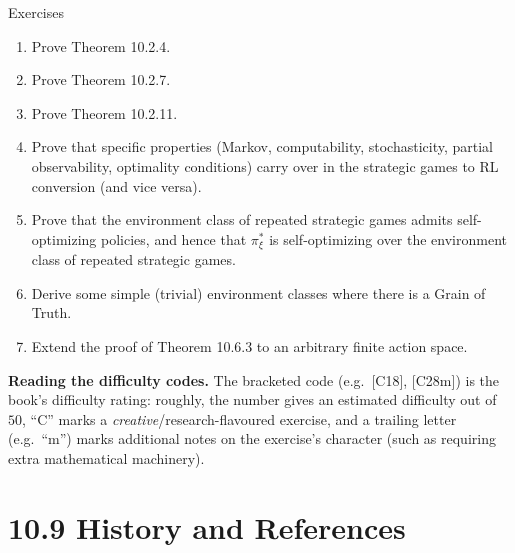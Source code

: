 \documentclass[aspectratio=169,10pt]{beamer}
\begin{document}
\begin{frame}[allowframebreaks]{Exercises}
  \begin{enumerate}
    \item[\textbf{1.}] [C18] Prove Theorem 10.2.4.
    \item[\textbf{2.}] [C28m] Prove Theorem 10.2.7.
    \item[\textbf{3.}] [C20] Prove Theorem 10.2.11.
    \item[\textbf{4.}] [C25] Prove that specific properties (Markov,
      computability, stochasticity, partial observability, optimality
      conditions) carry over in the strategic games to RL conversion (and
      vice versa).
    \item[\textbf{5.}] [C28] Prove that the environment class of repeated
      strategic games admits self-optimizing policies, and hence that
      $\pi^*_\xi$ is self-optimizing over the environment class of
      repeated strategic games.
    \item[\textbf{6.}] [C18] Derive some simple (trivial) environment
      classes where there is a Grain of Truth.
    \item[\textbf{7.}] [C25] Extend the proof of Theorem 10.6.3 to an
      arbitrary finite action space.
  \end{enumerate}
  \vspace{0.4em}
  \textbf{Reading the difficulty codes.} The bracketed code (e.g.\
  [C18], [C28m]) is the book's difficulty rating: roughly, the number
  gives an estimated difficulty out of $50$, ``C'' marks a
  \emph{creative}/research-flavoured exercise, and a trailing letter
  (e.g.\ ``m'') marks additional notes on the exercise's character (such
  as requiring extra mathematical machinery).
\end{frame}

\section{10.9 History and References}
\end{document}
